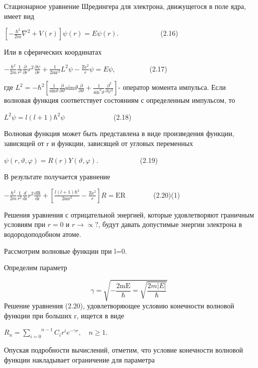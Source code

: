 \documentclass[a4paper,14pt, openany, twoside, draft]{extbook} %
\begin{document}
Стационарное уравнение Шредингера для электрона, движущегося в поле ядра, имеет вид

 $\left[-\frac{\hbar ^2}{2m}\nabla ^2+V(r)\right]\psi (r)=\mathit{E\psi }(r)$.\ \ \ \ \ \ \ \ \ \ \ \ (2.16)

Или в сферических координатах

 $-\frac{\hbar ^2}{2m}\frac 1{r^2}\frac{\partial }{\partial r}r^2\frac{\partial \psi }{\partial r}+\frac 1{2{\text{mr}}^2}L^2\psi -\frac{{\text{Ze}}^2} r\psi =\mathit{E\psi }$,\ \ \ \ \ \ \ \ \ \ (2.17)

где  $L^2=-\hbar ^2\left[\frac 1{\text{sin}\vartheta }\frac{\partial }{\partial \vartheta }\text{sin}\vartheta \frac{\partial }{\partial \vartheta }+\frac 1{\text{sin}^2\vartheta }\frac{\partial ^2}{\partial \varphi ^2}\right]${}- оператор момента импульса. Если волновая функция соответствует состояниям с определенным импульсом, то

 $L^2\psi =l(l+1)\hbar ^2\psi $\ \ \ \ \ \ \ \ \ \ \ \ \ \ (2.18)

Волновая функция может быть представлена в виде произведения функции, зависящей от r и функции, зависящей от угловых переменных

 $\psi (r,\vartheta ,\varphi )=R(r)Y(\vartheta ,\varphi )$.\ \ \ \ \ \ \ \ \ \ \ \ (2.19)

В результате получается уравнение

 $-\frac{\hbar ^2}{2m}\frac 1{r^2}\frac d{{\text{dr}}}r^2\frac{{\text{dR}}}{{\text{dr}}}+\left[\frac{l(l+1)\hbar ^2}{2{\text{mr}}^2}-\frac{{\text{Ze}}^2} r\right]R={\text{ER}}$\ \ \ \ \ \ \ \ (2.20)(1)

Решения уравнения с отрицательной энергией, которые удовлетворяют граничным условиям при  $r=0$ и  $r\rightarrow \propto ?$, будут давать допустимые энергии электрона в водородоподобном атоме.

Рассмотрим волновые функции при l=0.

Определим параметр

\begin{equation*}
\gamma =\sqrt{-\frac{2{\text{mE}}}{\hbar }=\sqrt{\frac{2m|E|}{\hbar }}}
\end{equation*}
Решение уравнения (2.20), удовлетворяющее условию конечности волновой функции при больших r, ищется в виде

 $R_n=\overset{n-1}{\underset{i=0}{\sum }}C_ir^ie^{-\gamma r},\quad n\geq 1$.

Опуская подробности вычислений, отметим, что условие конечности волновой функции накладывает ограничение для параметра
\end{document}
